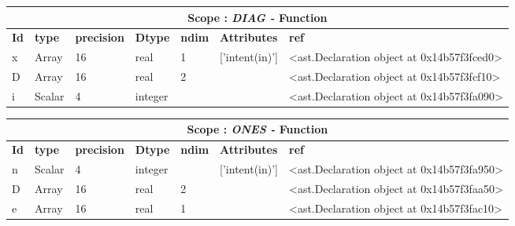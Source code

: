 \documentclass{report}
\begin{document}
 \vspace{1cm}

\begin{center}
\begin{longtable}{|p{3.5cm}|p{1.5cm}|p{1.5cm}|p{1.5cm}|p{1cm}|p{2cm}|p{4cm}| }
\hline
\multicolumn{7}{|c|}{\textbf{Scope : \qquad}  \textbf{\textit{DIAG - }Function}}\\ 
\hline
\textbf{Id} & \textbf{type} & \textbf{precision} & \textbf{Dtype} & \textbf{ndim} & \textbf{Attributes} & \textbf{ref} \\\hline

x & Array & 16 & real & 1 & ['intent(in)'] & <ast.Declaration object at 0x14b57f3fced0> \\\hline

D & Array & 16 & real & 2 &  & <ast.Declaration object at 0x14b57f3fcf10> \\\hline

i & Scalar & 4 & integer &  &  & <ast.Declaration object at 0x14b57f3fa090> \\\hline

\end{longtable}
\end{center}

 \vspace{1cm}

\begin{center}
\begin{longtable}{|p{3.5cm}|p{1.5cm}|p{1.5cm}|p{1.5cm}|p{1cm}|p{2cm}|p{4cm}| }
\hline
\multicolumn{7}{|c|}{\textbf{Scope : \qquad}  \textbf{\textit{ONES - }Function}}\\ 
\hline
\textbf{Id} & \textbf{type} & \textbf{precision} & \textbf{Dtype} & \textbf{ndim} & \textbf{Attributes} & \textbf{ref} \\\hline

n & Scalar & 4 & integer &  & ['intent(in)'] & <ast.Declaration object at 0x14b57f3fa950> \\\hline

D & Array & 16 & real & 2 &  & <ast.Declaration object at 0x14b57f3faa50> \\\hline

e & Array & 16 & real & 1 &  & <ast.Declaration object at 0x14b57f3fac10> \\\hline

\end{longtable}
\end{center}

 \vspace{1cm}
\end{document}
